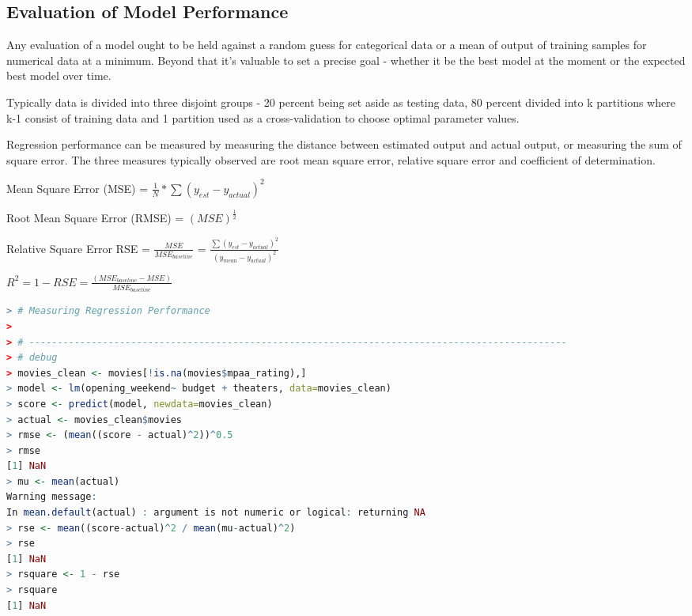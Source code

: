 \documentclass{article}
\begin{document}
\begin{spacing}{1.1}
\section{Evaluation of Model Performance}

Any evaluation of a model ought to be held against a random guess for categorical data or a mean of output of training samples for numerical data at a minimum.  Beyond that it's valuable to set a precise goal - whether it be the best model at the moment or the expected best model over time.  

\vspace{3mm}

Typically data is divided into three disjoint groups - 20 percent being set aside as testing data, 80 percent divided into k partitions where k-1 consist of training data and 1 partition used as a cross-validation to choose optimal parameter values.  

\vspace{3mm}

Regression performance can be measured by measuring the distance between estimated output and actual output, or measuring the sum of square error.  The three measures typically observed are root mean square error, relative square error and coefficient of determination.  

\vspace{2mm}

Mean Square Error (MSE) = $\frac{1}{N} * \sum (y_{est} - y_{actual})^2$

Root Mean Square Error (RMSE) = $(MSE)^{\frac{1}{2}}$

Relative Square Error RSE = $\frac{MSE}{MSE_{baseline}}$ = $\frac{\sum(y_{est} - y_{actual})^2}{(y_{mean}-y_{actual})^2}$

$R^2 = 1 - RSE = \frac{(MSE_{baseline} - MSE)}{MSE_{baseline}}$

\vspace{3mm}

\begin{lstlisting}[language=R]
> # Measuring Regression Performance
> 
> # -----------------------------------------------------------------------------------------------
> # debug
> movies_clean <- movies[!is.na(movies$mpaa_rating),]
> model <- lm(opening_weekend~ budget + theaters, data=movies_clean)
> score <- predict(model, newdata=movies_clean)
> actual <- movies_clean$movies
> rmse <- (mean((score - actual)^2))^0.5
> rmse
[1] NaN
> mu <- mean(actual)
Warning message:
In mean.default(actual) : argument is not numeric or logical: returning NA
> rse <- mean((score-actual)^2 / mean(mu-actual)^2)
> rse
[1] NaN
> rsquare <- 1 - rse
> rsquare
[1] NaN
\end{lstlisting}


\end{spacing}
\end{document}
